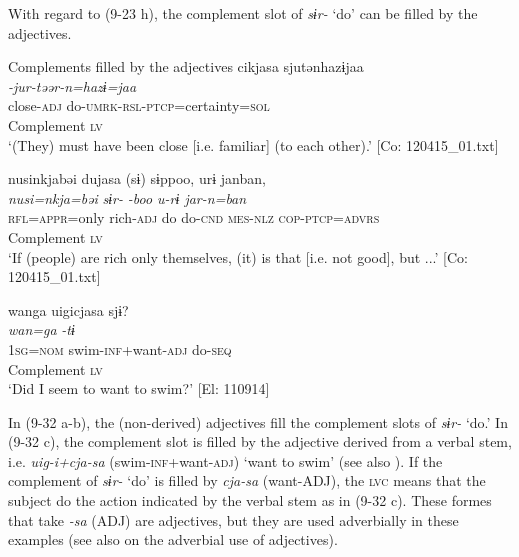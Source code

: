With regard to (9-23 h), the complement slot of \textit{sɨr-} ‘do’ can be filled by the adjectives.

\ea   Complements filled by the adjectives \label{ex:9.32}
\ea %
 \gllll  cikjasa  sjutənhazɨjaa\\
      \textit{}  \textit{-jur-təər-n=hazɨ=jaa}\\
      close-\textsc{adj}  do-\textsc{umrk}-\textsc{rsl}-\textsc{ptcp}=certainty=\textsc{sol}\\
      Complement  \textsc{lv}\\
      \glt       ‘(They) must have been close [i.e. familiar] (to each other).’ [Co: 120415\_01.txt]

\ex \label{ex:9.32b} %
    \gllll  nusinkjabəi  dujasa  (sɨ)  sɨppoo,  urɨ  janban,\\
      \textit{nusi=nkja=bəi}  \textit{}  \textit{sɨr-}  \textit{-boo  u-rɨ  jar-n=ban}\\
      \textsc{rfl}=\textsc{appr}=only  rich-\textsc{adj}  do  do-\textsc{cnd}  \textsc{mes}-\textsc{nlz}  \textsc{cop}-\textsc{ptcp}=\textsc{advrs}\\
        Complement    \textsc{lv}    \\
      \glt       ‘If (people) are rich only themselves, (it) is that [i.e. not good], but ...’ [Co: 120415\_01.txt]

\ex \label{ex:9.32c} %
    \gllll  wanga  uigicjasa  sjɨ?\\
      \textit{wan=ga}  \textit{}  \textit{-tɨ}\\
      1\textsc{sg}=\textsc{nom}  swim-\textsc{inf}+want-\textsc{adj}  do-\textsc{seq}\\
        Complement  \textsc{lv}\\
      \glt       ‘Did I seem to want to swim?’ [El: 110914]
    \z
\z

In (9-32 a-b), the (non-derived) adjectives fill the complement slots of \textit{sɨr-} ‘do.’ In (9-32 c), the complement slot is filled by the adjective derived from a verbal stem, i.e. \textit{uig-i+cja-sa} (swim-\textsc{inf}+want-\textsc{adj}) ‘want to swim’ (see also ). If the complement of \textit{sɨr-} ‘do’ is filled by \textit{cja-sa} (want-ADJ), the \textsc{lvc} means that the subject  do the action indicated by the verbal stem as in (9-32 c). These formes that take \textit{{}-sa} (ADJ) are adjectives, but they are used adverbially in these examples (see also  on the adverbial use of adjectives).

